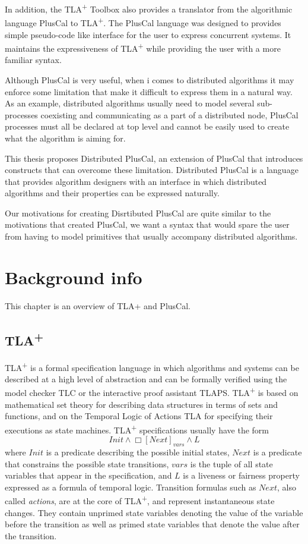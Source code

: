 \documentclass{thesul}
\newcommand{\tlaplus}{TLA\textsuperscript{+}\xspace}
\begin{document}
In addition, the \tlaplus Toolbox also provides a translator from the algorithmic language PlusCal to \tlaplus. The PlusCal language was designed to provides simple pseudo-code like interface for the user to express concurrent systems. It maintains the expressiveness of \tlaplus while providing the user with a more familiar syntax.

Although PlusCal is very useful, when i comes to distributed algorithms it may enforce some limitation that make it difficult to express them in a natural way. As an example, distributed algorithms usually need to model several sub-processes coexisting and communicating as a part of a distributed node, PlusCal processes must all be declared at top level and cannot be easily used to create what the algorithm is aiming for. 

This thesis proposes Distributed PlusCal, an extension of PlusCal that introduces constructs that can overcome these limitation. Distributed PlusCal is a language that provides algorithm designers with an interface in which distributed algorithms and their properties can be expressed naturally.

Our motivations for creating Disrtibuted PlusCal are quite similar to the motivations that created PlusCal, we want a syntax that would spare the user from having to model primitives that usually accompany distributed algorithms.


\chapter{Background info}

This chapter is an overview of TLA+ and PlusCal.
\section{\tlaplus}

\tlaplus is a formal specification language in which algorithms and systems can be described at a high level of abstraction and can be formally verified using the model checker TLC or the interactive proof assistant TLAPS. \tlaplus is based on mathematical set theory for describing data structures in terms of sets and functions, and on the Temporal Logic of Actions TLA for specifying their executions as state machines. \tlaplus specifications usually have the form
\[
  Init \land \Box[Next]_{vars} \land L
\]
where $Init$ is a predicate describing the possible initial states, $Next$ is a predicate that constrains the possible state transitions, $vars$ is the tuple of all state variables that appear in the specification, and $L$ is a liveness or fairness property expressed as a formula of temporal logic. Transition formulas such as $Next$, also called \emph{actions}, are at the core of \tlaplus, and represent instantaneous state changes. They contain unprimed state variables denoting the value of the variable before the transition as well as primed state variables that denote the value after the transition.
\end{document}
